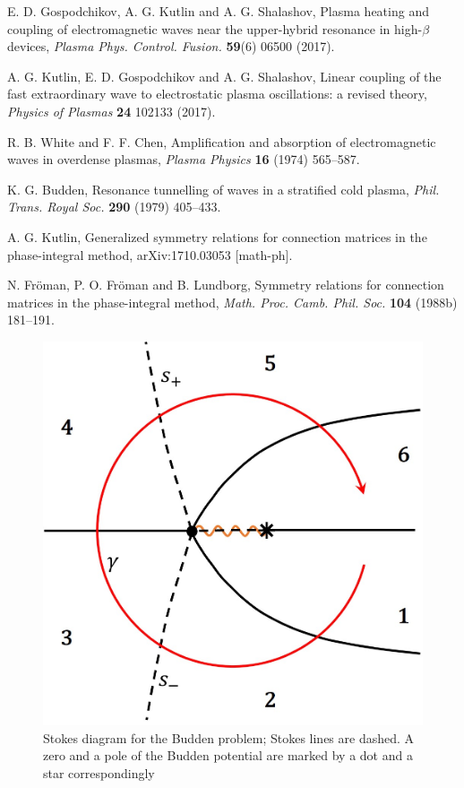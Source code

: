 \documentclass[asy]{iosart2x}
\begin{document}
\begin{thebibliography}{30}
 E. D. Gospodchikov, A. G. Kutlin and A. G. Shalashov, 
Plasma heating and coupling of electromagnetic waves near the upper-hybrid resonance in high-$\beta$ devices,
\textit{Plasma Phys. Control. Fusion.} \textbf{59}(6) 06500 (2017).

 A. G. Kutlin, E. D. Gospodchikov and A. G. Shalashov, 
Linear coupling of the fast extraordinary wave to electrostatic plasma oscillations: a revised theory,
\textit{Physics of Plasmas} \textbf{24} 102133 (2017).

 R. B. White and F. F. Chen, 
Amplification and absorption of electromagnetic waves in overdense plasmas,
\textit{Plasma Physics} \textbf{16} (1974) 565--587.

 K. G. Budden, 
Resonance tunnelling of waves in a stratified cold plasma,
\textit{Phil. Trans. Royal Soc.} \textbf{290} (1979) 405--433.

  A. G. Kutlin, 	
Generalized symmetry relations for connection matrices in the phase-integral method,
arXiv:1710.03053 [math-ph].

 N. Fr\"oman, P. O. Fr\"oman and B. Lundborg, 
Symmetry relations for connection matrices in the phase-integral method,
\textit{Math. Proc. Camb. Phil. Soc.} \textbf{104} (1988b) 181--191.

\end{thebibliography}

\begin{figure}
\centering
\noindent
\includegraphics[width=\textwidth]{sd.jpg}
\caption
{Stokes diagram for the Budden problem; Stokes lines are dashed.
A zero and a pole of the Budden potential are marked by a dot and a star correspondingly}
\label{fig:diagram}
\end{figure} 
\end{document}
